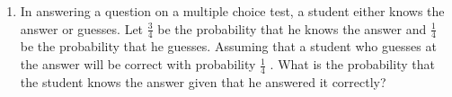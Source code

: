 \renewcommand{\theequation}{\theenumi}
\begin{enumerate}[label=\thesection.\arabic*.,ref=\thesection.\theenumi]
\item In answering a question on a multiple choice
test, a student either knows the answer or
guesses. Let $\frac{3}{4}$ be the probability that he knows
the answer and $\frac{1}{4}$ be the probability that he
guesses. Assuming that a student who guesses
at the answer will be correct with probability $\frac{1}{4}$ .
What is the probability that the student knows
the answer given that he answered it correctly?
\end{enumerate}